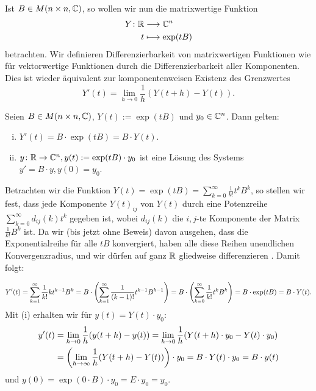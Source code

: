 Ist $B \in M(n \times n,\mathbb{C})$, so wollen wir nun die matrixwertige Funktion
\begin{align*}
	Y\colon \mathbb{R} &\longrightarrow \mathbb{C}^{n} \\
	t &\longmapsto \exp(tB)
\end{align*}
betrachten.
Wir definieren Differenzierbarkeit von matrixwertigen Funktionen wie für vektorwertige Funktionen durch die Differenzierbarkeit aller Komponenten.
Dies ist wieder äquivalent zur komponentenweisen Existenz des Grenzwertes
\[
	Y'(t) = \lim\limits_{h \rightarrow 0} \frac{1}{h}(Y(t+h)-Y(t)).
\]

\begin{satz}
	\label{satz:10.6}
	Seien $B \in M(n \times n,\mathbb{C})$, $Y(t) := \exp(tB)$ und $y_0 \in \mathbb{C}^{n}$.
	Dann gelten:
	\begin{enumerate}[(i)]
		\item $Y'(t) = B \cdot \exp(tB) = B \cdot Y(t)$.
		\item $y\colon \mathbb{R} \rightarrow \mathbb{C}^{n}, y(t) := \exp(tB) \cdot y_0$ ist eine Lösung des Systems $y' = B \cdot y, y(0) = y_0$.
	\end{enumerate}
\end{satz}

\begin{beweis}
	Betrachten wir die Funktion $Y(t) = \exp(tB) = \sum_{k=0}^{\infty} \frac{1}{k!} t^{k} B^{k}$, so stellen wir fest, dass jede Komponente $Y(t)_{ij}$ von $Y(t)$ durch eine Potenzreihe $\sum_{k=0}^{\infty} d_{ij}(k)t^{k}$ gegeben ist, wobei $d_{ij}(k)$ die $i,j$-te Komponente der Matrix $\frac{1}{k!} B^{k}$ ist.
	Da wir (bis jetzt ohne Beweis) davon ausgehen, dass die Exponentialreihe für alle $tB$ konvergiert, haben alle diese Reihen unendlichen Konvergenzradius, und wir dürfen auf ganz $\mathbb{R}$ gliedweise differenzieren .
	Damit folgt:
	
	\[
		Y'(t) = \sum_{k=1}^{\infty} \frac{1}{k!} kt^{k-1} B^{k} = B \cdot \left(\sum_{k=1}^{\infty} \frac{1}{(k-1)!} t^{k-1} B^{k-1}\right) = B \cdot \left(\sum_{k=0}^{\infty} \frac{1}{k!} t^{k} B^{k}\right) = B \cdot \exp(tB) = B \cdot Y(t).
	\]
	Mit (i) erhalten wir für $y(t) = Y(t) \cdot y_0$:
	\begin{align*}
		y'(t) &= \lim\limits_{h \rightarrow 0} \frac{1}{h} (y(t+h)-y(t)) = \lim\limits_{h \rightarrow 0} \frac{1}{h} (Y(t+h) \cdot y_0 - Y(t) \cdot y_0) \\
		&= \left(\lim\limits_{h \rightarrow \infty} \frac{1}{h}(Y(t+h)-Y(t))\right) \cdot y_0 = B \cdot Y(t) \cdot y_0 = B \cdot y(t)
	\end{align*}
	und $y(0) = \exp(0\cdot B) \cdot y_0 = E \cdot y_0 = y_0$. \qedhere
\end{beweis}

